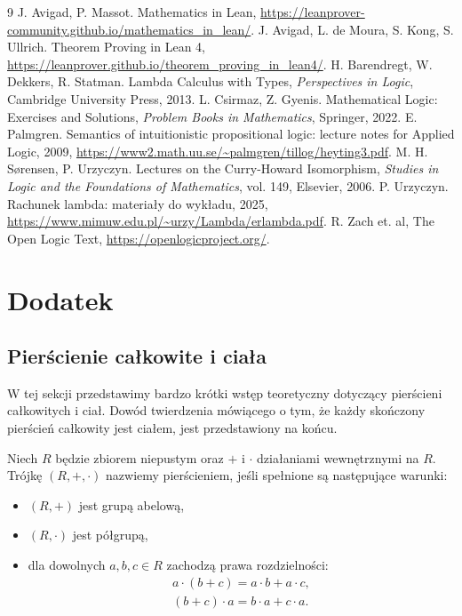 \documentclass[polish,pretty,bibliography=totocnumbered]{angav}
\begin{document}
\begin{thebibliography}{9}
     J. Avigad, P. Massot. Mathematics in Lean, \url{https://leanprover-community.github.io/mathematics_in_lean/}.
     J. Avigad, L. de Moura, S. Kong, S. Ullrich. Theorem Proving in Lean 4, \url{https://leanprover.github.io/theorem_proving_in_lean4/}.
     H. Barendregt, W. Dekkers, R. Statman. Lambda Calculus with Types, \textit{Perspectives in Logic}, Cambridge University Press, 2013.
     L. Csirmaz, Z. Gyenis. Mathematical Logic: Exercises and Solutions, \textit{Problem Books in Mathematics}, Springer, 2022.
     E. Palmgren. Semantics of intuitionistic propositional logic: lecture notes for Applied Logic, 2009, \url{https://www2.math.uu.se/~palmgren/tillog/heyting3.pdf}.
     M. H. Sørensen, P. Urzyczyn. Lectures on the Curry-Howard Isomorphism, \textit{Studies in Logic and the Foundations of Mathematics}, vol. 149, Elsevier, 2006.
     P. Urzyczyn. Rachunek lambda: materiały do wykładu, 2025, \url{https://www.mimuw.edu.pl/~urzy/Lambda/erlambda.pdf}.
     R. Zach et. al, The Open Logic Text, \url{https://openlogicproject.org/}.
\end{thebibliography}

\appendix
\section{Dodatek}

\subsection{Pierścienie całkowite i ciała}
\label{ssec:finite-integral-domain}

W tej sekcji przedstawimy bardzo krótki wstęp teoretyczny dotyczący pierścieni całkowitych i ciał. Dowód twierdzenia mówiącego o tym, że każdy skończony pierścień całkowity jest ciałem, jest przedstawiony na końcu.

\begin{definition}[pierścień]
    Niech $R$ będzie zbiorem niepustym oraz $+$ i $\cdot$ działaniami wewnętrznymi na $R$. Trójkę $(R, +, \cdot)$ nazwiemy pierścieniem, jeśli spełnione są następujące warunki:
    \begin{itemize}[nosep]
        \item $(R, +)$ jest grupą abelową,
        \item $(R, \cdot)$ jest półgrupą,
        \item dla dowolnych $a, b, c \in R$ zachodzą prawa rozdzielności:
        \begin{align*}
            a \cdot (b + c) = a \cdot b + a \cdot c, \\
            (b + c) \cdot a = b \cdot a + c \cdot a.
        \end{align*}
    \end{itemize}
\end{definition}
\end{document}
